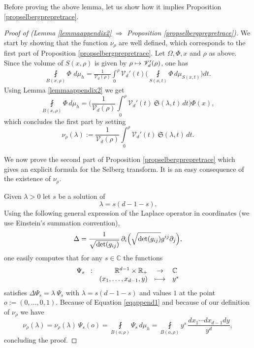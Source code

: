 \documentclass[10pt]{amsart}
\let\mathcal\mathscr
\def\mto{\mathchoice{\longmapsto}{\mapsto}{\mapsto}{\mapsto}}
\theoremstyle{plain}
\theoremstyle{definition}
\newcommand{\RR}{\mathbb{R}}
\newcommand{\CC}{\mathbb{C}}
\newcommand{\inte}[1]{\underset{#1}{\int}}
\newcommand{\finte}[3]{\underset{#1}{\fint} {#2} \, {#3}}
\newcommand{\fonction}[5]{\begin{array}{r r c l}
#1 \hspace{2mm} : & #2 & \displaystyle\to & #3 \\
& #4 & \displaystyle\mto & #5 \\
\end{array}}
\begin{document}
Before proving the above lemma, let us show how it implies Proposition \ref{propselbergprepretrace}.

\begin{proof}[Proof of (Lemma \ref{lemmaappendix2} $\Rightarrow$ Proposition \ref{propselbergprepretrace})]
We start by showing that the function $\nu_{\rho}$ are well defined, which corresponds to the first part of Proposition \ref{propselbergprepretrace}. Let $\Omega, \Phi, x$ and $\rho$ as above. Since the volume of $S(x, \rho)$ is given by $\rho \mto \mathcal{V}_d'(\rho)$, one has
\begin{align*}
\finte{B(x,\rho)} \Phi \,d \mu_h = \frac{1}{\mathcal{V}_d(\rho)} \inte{0}^{\rho}
\mathcal{V}_d'(t) \biggl(\finte{S(x, t)}{\Phi}{ d \mu_{S(x,t)}} \biggr) dt.
\end{align*}
Using Lemma \ref{lemmaappendix2} we get
\begin{equation}
\label{eqappend1}
\finte{B(x,\rho)}{\Phi}{d \mu_h} = \biggl(\frac{1}{\mathcal{V}_d(\rho)} \inte{0}^{\rho}
\mathcal{V}_d'(t) \ \mathfrak{S}(\lambda,t) \,dt \biggr) \Phi(x),
\end{equation}
which concludes the first part by setting
\[
\nu_{\rho}(\lambda) := \frac{1}{\mathcal{V}_d(\rho)} \inte{0}^{\rho}
\mathcal{V}_d'(t) \ \mathfrak{S}(\lambda,t) \,dt.
\]

We now prove the second part of Proposition \ref{propselbergprepretrace} which gives an explicit formula for the Selberg transform. It is an easy consequence of the existence of $\nu_\rho$.

Given $\lambda > 0$ let $s$ be a solution of
\[
\lambda = s (d-1-s).
\]
Using the following general expression of the Laplace operator in coordinates (we use Einstein's summation convention),
\[
\Delta = \frac{1}{\sqrt{\det(g_{ij})}}\, \partial_i \Bigl(\sqrt{\det(g_{ij})} g^{ij} \partial_j \Bigr),
\]
one easily computes that for any $s \in \CC$ the functions
\[
\fonction{\Psi_{s}}{\RR^{d-1} \times \RR_+}{\CC}{(x_1,\dots, x_{d-1}, y)}{y^s}
\]
satisfies $\Delta \Psi_{s} = \lambda \ \Psi_{s}$ with $\lambda = s(d-1-s)$ and values $1$ at the point $o := (0,\dots,0, 1)$.
Because of Equation \ref{eqappend1} and because of our definition of $\nu_{\rho}$ we have
\[
\nu_{\rho}(\lambda) = \nu_{\rho}(\lambda) \ \Psi_{s}(o) = \underset{{B(o,\rho)}}{\fint} \Psi_{s} \,d \mu_h = \finte{B(o,\rho)} { y^s}{ \frac{dx_1\cdots dx_{d-1} dy}{y^d}},
\]
concluding the proof.
\end{proof}
\end{document}
